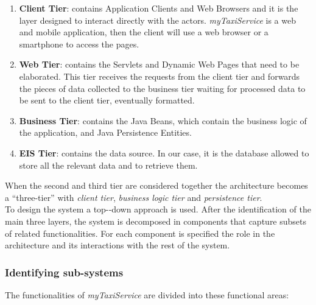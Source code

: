 \documentclass[a4paper,11pt]{report} %
\newcommand{\mts}{\mbox{\normalfont\itshape myTaxiService}}
\begin{document}
		\begin{enumerate}
			\item \textbf{Client Tier}: contains Application Clients and Web Browsers and it is the layer designed to interact directly with the actors. \mts{} is a web and mobile application, then the client will use a web browser or a smartphone to access the pages.
			\item \textbf{Web Tier}: contains the Servlets and Dynamic Web Pages that need to be elaborated. This tier receives the requests from the client tier and forwards the pieces of data collected to the business tier waiting for processed data to be sent to the client tier, eventually formatted.
			\item \textbf{Business Tier}: contains the Java Beans, which contain the business logic of the application, and Java Persistence Entities.
			\item \textbf{EIS Tier}: contains the data source. In our case, it is the database allowed to store all the relevant data and to retrieve them.									
		\end{enumerate}
	When the second and third tier are considered together the architecture becomes a ``three-tier'' with \textit{client tier}, \textit{business logic tier} and \textit{persistence tier}.\\
	To design the system a top-­‐down approach is used. After the identification of the main three layers, the system is decomposed in components that capture subsets of related functionalities. For each component is specified the role in the architecture and its interactions with the rest of the system. 
	
	\subsubsection{Identifying sub-systems} The functionalities of \mts{} are divided into these functional areas:
	
\end{document}
